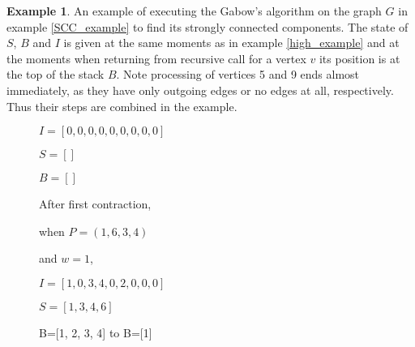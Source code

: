 \documentclass{report}
\theoremstyle{plain}
\theoremstyle{definition}
\newtheorem{example}{Example}
\theoremstyle{remark}
\numberwithin{definition}{chapter}
\numberwithin{example}{chapter}
\numberwithin{figure}{chapter}
\numberwithin{theorem}{chapter}
\numberwithin{lemma}{chapter}
\begin{document}
\begin{example}

An example of executing the Gabow's algorithm on the graph $G$ in example \ref{SCC_example} to find its strongly connected components. The state of $S$, $B$ and $I$ is given at the same moments as in example \ref{high_example} and at the moments when  
returning from recursive call for a vertex $v$ its position is at the top of the stack $B$. Note processing of vertices 5 and 9 ends almost immediately, as they have only outgoing edges or no edges at all, respectively. Thus their steps are combined in the example.

\begin{figure}[h]

\begin{minipage}[h]{0.24\textwidth}

$I=[0, 0, 0, 0, 0, 0, 0, 0, 0]$

$S=[]$

$B=[]$

\end{minipage}
\hfill
{}

After first contraction,

when $P=(1,6,3,4)$

and $w=1$,

$I=[1, 0, 3, 4, 0, 2, 0, 0, 0]$

$S=[1, 3, 4, 6]$

B=[1, 2, 3, 4] to B=[1]
\endminipage\hfill
{}


\end{figure}
\end{example}
\end{document}
